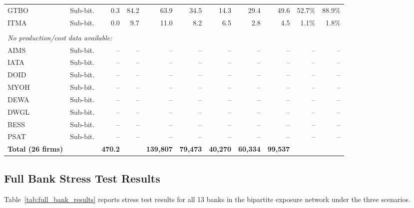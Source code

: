 \begin{landscape}
\begin{longtable}{llrrrrrrrrr}
GTBO & Sub-bit. & 0.3 & 84.2 & 63.9 & 34.5 & 14.3 & 29.4 & 49.6 & 52.7\% & 88.9\% \\
ITMA & Sub-bit. & 0.0 & 9.7 & 11.0 & 8.2 & 6.5 & 2.8 & 4.5 & 1.1\% & 1.8\% \\
\\[-2pt]
\multicolumn{11}{l}{\textit{No production/cost data available:}} \\[2pt]
AIMS & Sub-bit. & -- & -- & -- & -- & -- & -- & -- & -- & -- \\
IATA & Sub-bit. & -- & -- & -- & -- & -- & -- & -- & -- & -- \\
DOID & Sub-bit. & -- & -- & -- & -- & -- & -- & -- & -- & -- \\
MYOH & Sub-bit. & -- & -- & -- & -- & -- & -- & -- & -- & -- \\
DEWA & Sub-bit. & -- & -- & -- & -- & -- & -- & -- & -- & -- \\
DWGL & Sub-bit. & -- & -- & -- & -- & -- & -- & -- & -- & -- \\
BESS & Sub-bit. & -- & -- & -- & -- & -- & -- & -- & -- & -- \\
PSAT & Sub-bit. & -- & -- & -- & -- & -- & -- & -- & -- & -- \\
\midrule
\textbf{Total (26 firms)} & & \textbf{470.2} & & \textbf{139,807} & \textbf{79,473} & \textbf{40,270} & \textbf{60,334} & \textbf{99,537} & & \\
\end{longtable}
\end{landscape}



\subsection{Full Bank Stress Test Results}
\label{subsec:full_bank}

Table~\ref{tab:full_bank_results} reports stress test results for all 13 banks in the bipartite exposure network under the three scenarios.

